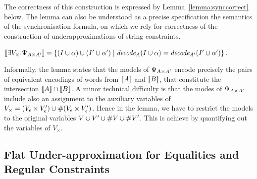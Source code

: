 \documentclass[sigplan,review,anonymous]{acmart}\settopmatter{printfolios=true,printccs=false,printacmref=false}
\begin{document}
The correctness of this construction is expressed by Lemma~\ref{lemma:synccorrect} below. The lemma can also be understood as a precise specification the semantics of the synchronisation formula, on which we rely for correctness of the construction of underapproximations of string constraints. 
%
\begin{lemma}\label{lemma:synccorrect}
$[\![\exists V_\times . \Psi_{A \times A'}]\!] = \{(I\cup\alpha)\cup(I'\cup\alpha') \mid \mathit{decode_{A}}(I\cup\alpha) = \mathit{decode_{A'}}(I'\cup\alpha')\}$. 
\end{lemma}
%
Informally, the lemma states that the models of $\Psi_{A \times A'}$ encode precisely the pairs of equivalent encodings of words from $[\![A]\!]$ and $[\![B]\!]$, that constitute the intersection $[\![A]\!] \cap [\![B]\!]$. A minor technical difficulty is that the modes of $\Psi_{A \times A'}$ include also an assignment to the auxiliary variables of $V_\times = (V_\epsilon\times V'_\epsilon) \cup \#{(V_\epsilon\times V'_\epsilon)}$. Hence in the lemma, we have to restrict the models to the original variables $V \cup V' \cup \#{V} \cup \#{V'}$. This is  achieve by quantifying out the variables of $V_\times$.









\subsection{Flat Under-approximation for Equalities and Regular Constraints} \label{section:eq}
\end{document}
